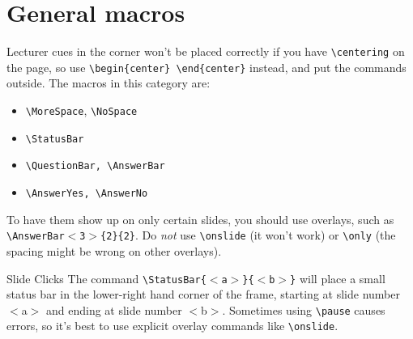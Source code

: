 \documentclass[10pt]{beamer}
\begin{document}
\section{General macros}
\frame{\tableofcontents[currentsection]}
\begin{frame}[t,fragile]
Lecturer cues in the corner won't be placed correctly if you have \verb|\centering| on the page, so use \verb|\begin{center} \end{center}| instead, and put the commands outside.
\vfill
The macros in this category are:
\begin{itemize}
\item \verb|\MoreSpace|, \verb|\NoSpace|
\item \verb|\StatusBar|
\item \verb|\QuestionBar, \AnswerBar|
\item \verb|\AnswerYes, \AnswerNo|
\end{itemize}
\vfill
To have them show up on only certain slides, you should use overlays, such as \texttt{\textbackslash AnswerBar$<$3$>$\{2\}\{2\}}. Do \textit{not} use  \texttt{\textbackslash onslide} (it won't work) or \texttt{\textbackslash only} (the spacing might be wrong on other overlays).
\end{frame}
\begin{frame}[t]{Slide Clicks}
The command \texttt{\textbackslash StatusBar\{$<$a$>$\}\{$<$b$>$\}} will place a small status bar in the lower-right hand corner of the frame, starting at slide number $<$a$>$ and ending at slide number $<$b$>$.\vfill
Sometimes using \texttt{\textbackslash pause} causes errors, so it's best to use explicit overlay commands like \texttt{\textbackslash onslide}.
\end{frame}
\end{document}
